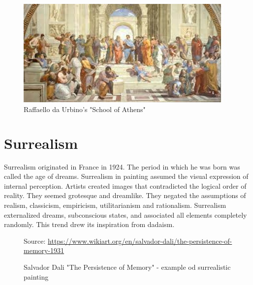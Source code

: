 \documentclass{report}
\begin{document}
\begin{itemize}
\begin{figure}[h]
\center
\includegraphics[height=5.3cm]{img/schoolofathens}
\caption{Raffaello da Urbino's "School of Athens"}
\label{fig:schoolofathens}
\end{figure}

\end{itemize}
    
\section{Surrealism}

Surrealism originated in France in 1924. The period in which he was born was called the age of dreams. Surrealism in painting assumed the visual expression of internal perception. Artists created images that contradicted the logical order of reality. They seemed grotesque and dreamlike. They negated the assumptions of realism, classicism, empiricism, utilitarianism and rationalism. Surrealism externalized dreams, subconscious states, and associated all elements completely randomly. This trend drew its inspiration from dadaism.

\begin{figure}[h]
\center
{} {Source: \url{https://www.wikiart.org/en/salvador-dali/the-persistence-of-memory-1931}}
\caption{Salvador Dali "The Persistence of Memory" -  example od surrealistic painting}
\label{fig:dali}
\end{figure}
\end{document}
